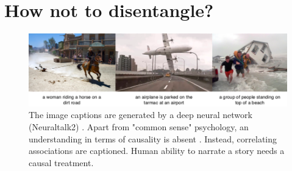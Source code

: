 
	\section{How not to disentangle?}


	\begin{figure}[t]
		\centering
		\includegraphics[trim={0cm 0cm 0cm 0cm},clip, width=1.\linewidth]{fig/notcausal}
		\caption{The image captions are generated by a deep neural network (Neuraltalk2) \cite{karpathy15neuraltalk}. Apart from "common sense" psychology, an understanding in terms of causality is absent \cite{Tenenbaum:2018wm}. Instead, correlating associations are captioned. Human ability to narrate a story needs a causal treatment.}
		\label{fig:notcausal}
	\end{figure}

